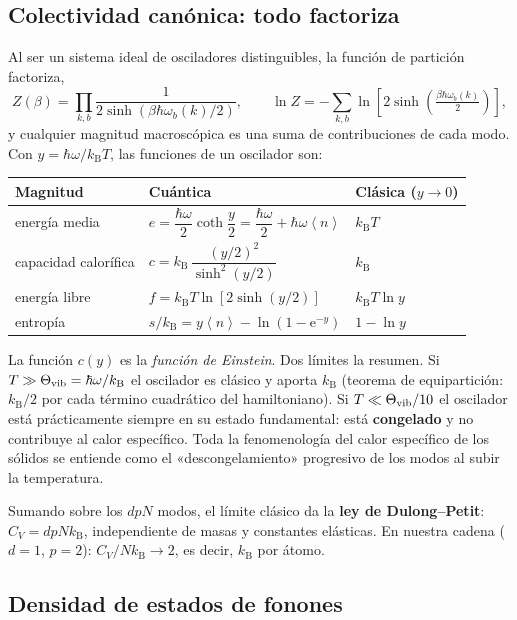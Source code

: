 \documentclass[11pt,a4paper]{article}
\newcommand{\kB}{k_{\mathrm B}}
\newcommand{\ee}{\mathrm{e}}
\newcommand{\avg}[1]{\left\langle #1\right\rangle}
\begin{document}
\subsection{Colectividad canónica: todo factoriza}

Al ser un sistema ideal de osciladores distinguibles, la función de partición
factoriza,
\begin{equation}
Z(\beta)=\prod_{k,b}\frac{1}{2\sinh\!\left(\beta\hbar\omega_b(k)/2\right)},
\qquad
\ln Z=-\sum_{k,b}\ln\!\left[2\sinh\!\left(\tfrac{\beta\hbar\omega_b(k)}{2}\right)\right],
\end{equation}
y cualquier magnitud macroscópica es una suma de contribuciones de cada modo.
Con $y=\hbar\omega/\kB T$, las funciones de un oscilador son:

\begin{center}
\small
\begin{tabular}{@{}lll@{}}
\toprule
Magnitud & Cuántica & Clásica ($y\to0$)\\
\midrule
energía media & $e=\dfrac{\hbar\omega}{2}\coth\dfrac y2=\dfrac{\hbar\omega}{2}+\hbar\omega\avg{n}$ & $\kB T$\\[6pt]
capacidad calorífica & $c=\kB\,\dfrac{(y/2)^2}{\sinh^2(y/2)}$ & $\kB$\\[6pt]
energía libre & $f=\kB T\ln\!\left[2\sinh(y/2)\right]$ & $\kB T\ln y$\\[4pt]
entropía & $s/\kB=y\avg{n}-\ln(1-\ee^{-y})$ & $1-\ln y$\\
\bottomrule
\end{tabular}
\end{center}

\noindent La función $c(y)$ es la \emph{función de Einstein}. Dos límites la
resumen. Si $T\gg\Theta_{\rm vib}=\hbar\omega/\kB$ el oscilador es clásico y
aporta $\kB$ (teorema de equipartición: $\kB/2$ por cada término cuadrático del
hamiltoniano). Si $T\ll\Theta_{\rm vib}/10$ el oscilador está prácticamente
siempre en su estado fundamental: está \textbf{congelado} y no contribuye al
calor específico. Toda la fenomenología del calor específico de los sólidos se
entiende como el «descongelamiento» progresivo de los modos al subir la
temperatura.

Sumando sobre los $dpN$ modos, el límite clásico da la \textbf{ley de
Dulong–Petit}: $C_V=dpN\kB$, independiente de masas y constantes elásticas. En
nuestra cadena ($d=1$, $p=2$): $C_V/N\kB\to2$, es decir, $\kB$ por átomo.

\subsection{Densidad de estados de fonones}
\end{document}
